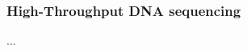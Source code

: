 \subsubsection{High-Throughput DNA sequencing} \label{background:biology:high_throughput_dna_sequencing}
...
